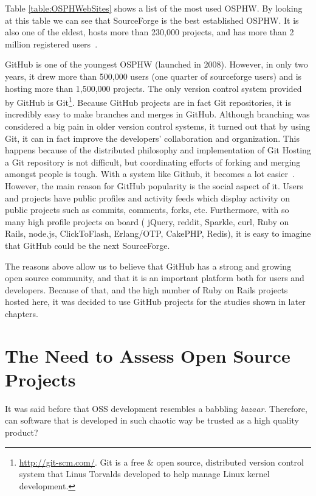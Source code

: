 

Table \ref{table:OSPHWebSites} shows a list of the most used OSPHW.
By looking at this table we can see that SourceForge is the best established OSPHW.
It is also one of the eldest, 
hosts more than 230,000 projects, and has more than 2 million registered users~\cite{christley2005collection}.

GitHub is one of the youngest OSPHW (launched in 2008). 
However, in only two years, it drew more than 500,000 users (one quarter of sourceforge users) and is hosting more than 1,500,000 projects. 
The only version control system provided by GitHub is 
Git\footnote{\url{http://git-scm.com/}. 
  Git is a free \& open source, distributed version control system that Linus Torvalds developed to help manage Linux kernel development.
}.
Because GitHub projects are in fact Git repositories, 
it is incredibly easy to make branches and merges in GitHub. 
Although branching was considered a big pain in older version control systems, 
it turned out that by using Git, it can in fact improve the developers' collaboration and organization.
This happens because of the distributed philosophy and implementation of Git
Hosting a Git repository is not difficult, but coordinating efforts of forking and merging amongst people is tough. 
With a system like Github, it becomes a lot easier~\cite{petercooper2010}.
However, the main reason for GitHub popularity is the social aspect of it.
Users and projects have public profiles and activity feeds which display activity on public projects such as commits, comments, forks, etc.
Furthermore, with so many high profile projects on board (
jQuery, 
reddit, 
Sparkle, 
curl, 
Ruby on Rails, 
node.js, 
ClickToFlash, 
Erlang/OTP, 
CakePHP, 
Redis), 
it is easy to imagine that GitHub could be the next SourceForge.

The reasons above allow us to believe that GitHub has a strong and growing open source community, 
and that it is an important platform both for users and developers. 
Because of that, and the high number of Ruby on Rails projects hosted here,
it was decided to use GitHub projects for the studies shown in later chapters.


\section{The Need to Assess Open Source Projects}

It was said before that OSS development resembles a babbling \textit{bazaar}.
Therefore, can software that is developed in such chaotic way be trusted as a high quality product?

